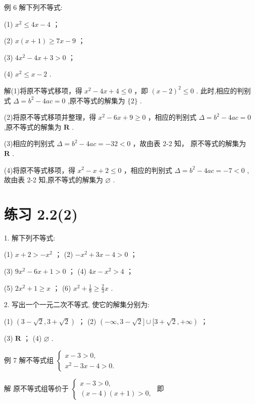 \documentclass[10pt]{article}
\begin{document}
例 6 解下列不等式:

(1) \({x}^{2} \leq  {4x} - 4\) ；

(2) \(x\left( {x + 1}\right)  \geq  {7x} - 9\) ；

(3) \(4{x}^{2} - {4x} + 3 > 0\) ；

(4) \({x}^{2} \leq  x - 2\) .

解(1)将原不等式移项，得 \({x}^{2} - {4x} + 4 \leq  0\) ，即 \({\left( x - 2\right) }^{2} \leq  0\) . 此时,相应的判别式 \(\Delta  = {b}^{2} - {4ac} = 0\) ,原不等式的解集为 \(\{ 2\}\) .

(2)将原不等式移项并整理，得 \({x}^{2} - {6x} + 9 \geq  0\) ，相应的判别式 \(\Delta  = {b}^{2} - {4ac} = 0\) ,原不等式的解集为 \(\mathbf{R}\) .

(3)相应的判别式 \(\Delta  = {b}^{2} - {4ac} =  - {32} < 0\) ，故由表 2-2 知， 原不等式的解集为 \(\mathbf{R}\) .

(4)将原不等式移项，得 \({x}^{2} - x + 2 \leq  0\) ，相应的判别式 \(\Delta  = {b}^{2} - {4ac} =  - 7 < 0\) ,故由表 2-2 知,原不等式的解集为 \(\varnothing\) .

\section*{练习 2.2(2)}

1. 解下列不等式:

(1) \(x + 2 >  - {x}^{2}\) ； (2) \(- {x}^{2} + {3x} - 4 > 0\) ；

(3) \(9{x}^{2} - {6x} + 1 > 0\) ； (4) \({4x} - {x}^{2} > 4\) ；

(5) \(2{x}^{2} + 1 \geq  x\) ； (6) \({x}^{2} + \frac{1}{9} \geq  \frac{2}{3}x\) .

2. 写出一个一元二次不等式, 使它的解集分别为:

(1) \(\left( {3 - \sqrt{2},3 + \sqrt{2}}\right)\) ； (2) \(\left( {-\infty ,3 - \sqrt{2}\rbrack \cup \lbrack 3 + \sqrt{2}, + \infty }\right)\) ；

(3) \(\mathbf{R}\) ； (4) \(\varnothing\) .

例 7 解不等式组 \(\left\{  \begin{array}{l} x - 3 > 0, \\  {x}^{2} - {3x} - 4 > 0. \end{array}\right.\)

解 原不等式组等价于 \(\left\{  \begin{array}{l} x - 3 > 0, \\  \left( {x - 4}\right) \left( {x + 1}\right)  > 0, \end{array}\right.\) 即
\end{document}
